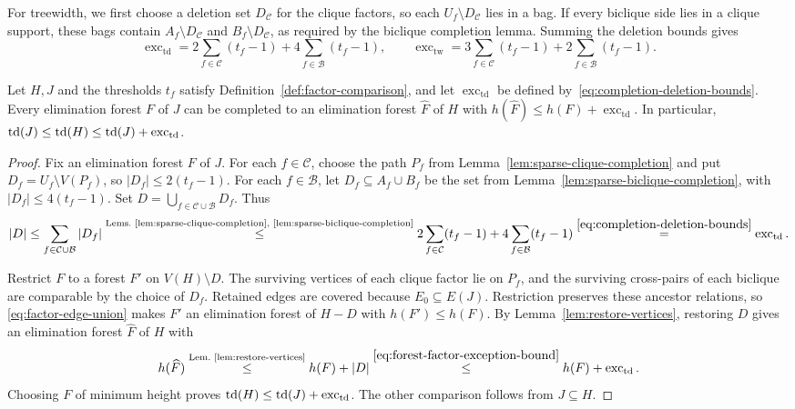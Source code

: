 For treewidth, we first choose a deletion set $D_{\mathcal C}$
for the clique factors, so each $U_f\setminus D_{\mathcal C}$ lies
in a bag. If every biclique side lies in a clique support, these
bags contain $A_f\setminus D_{\mathcal C}$ and
$B_f\setminus D_{\mathcal C}$, as required by the biclique
completion lemma. Summing the deletion bounds gives
\begin{equation}\label{eq:completion-deletion-bounds}
 \operatorname{exc}_{\mathrm{td}}=2\sum_{f\in\mathcal C}(t_f-1)+4\sum_{f\in\mathcal B}(t_f-1),
 \qquad
 \operatorname{exc}_{\mathrm{tw}}=3\sum_{f\in\mathcal C}(t_f-1)+2\sum_{f\in\mathcal B}(t_f-1).
\end{equation}

\begin{lemma}\label{lem:factor-sparsification}
Let $H,J$ and the thresholds $t_f$ satisfy
Definition~\ref{def:factor-comparison}, and let $\operatorname{exc}_{\mathrm{td}}$
be defined by~\eqref{eq:completion-deletion-bounds}.
Every elimination forest $F$ of $J$ can be
completed to an elimination forest $\widehat F$ of $H$ with
$h(\widehat F)\le h(F)+\operatorname{exc}_{\mathrm{td}}$. In particular,
$\operatorname{td}(J)\le\operatorname{td}(H)\le\operatorname{td}(J)+\operatorname{exc}_{\mathrm{td}}$.
\end{lemma}

\begin{proof}
Fix an elimination forest $F$ of $J$. For each $f\in\mathcal C$,
choose the path $P_f$ from Lemma~\ref{lem:sparse-clique-completion}
and put $D_f=U_f\setminus V(P_f)$, so $|D_f|\le2(t_f-1)$.
For each $f\in\mathcal B$, let $D_f\subseteq A_f\cup B_f$ be
the set from Lemma~\ref{lem:sparse-biclique-completion}, with
$|D_f|\le4(t_f-1)$. Set
$D=\bigcup_{f\in\mathcal C\cup\mathcal B}D_f$.
Thus
\begin{equation}\label{eq:forest-factor-exception-bound}
|D|\le\sum_{f\in\mathcal C\cup\mathcal B}|D_f| \overset{\text{Lems.~\ref{lem:sparse-clique-completion}, \ref{lem:sparse-biclique-completion}}}{\leq}
 2\sum_{f\in\mathcal C}(t_f-1)+4\sum_{f\in\mathcal B}(t_f-1)
 \overset{\eqref{eq:completion-deletion-bounds}}{=}\operatorname{exc}_{\mathrm{td}}.
\end{equation}

Restrict $F$ to a forest $F'$ on $V(H)\setminus D$.
The surviving vertices of each clique factor lie on $P_f$, and
the surviving cross-pairs of each biclique are comparable by the
choice of $D_f$. Retained edges are covered because $E_0\subseteq
E(J)$. Restriction preserves these ancestor relations, so
\eqref{eq:factor-edge-union} makes $F'$ an elimination forest of
$H-D$ with $h(F')\le h(F)$. By Lemma~\ref{lem:restore-vertices},
restoring $D$ gives an elimination forest $\widehat F$ of $H$ with
\[
 h(\widehat F)
 \overset{\text{Lem.~\ref{lem:restore-vertices}}}{\leq}h(F)+|D|
 \overset{\eqref{eq:forest-factor-exception-bound}}{\leq}
 h(F)+\operatorname{exc}_{\mathrm{td}}.
\]
Choosing $F$ of minimum height proves
$\operatorname{td}(H)\le\operatorname{td}(J)+\operatorname{exc}_{\mathrm{td}}$. The other comparison follows from
$J\subseteq H$.
\end{proof}

